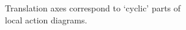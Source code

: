 \documentclass[preview]{standalone}
\begin{document}
Translation axes correspond to `cyclic' parts of \\ local action diagrams.\\
\end{document}
